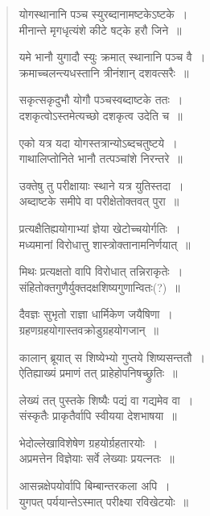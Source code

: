 \documentclass[11pt, openany]{book}
\begin{document}
\begin{quote}
{\qt योगस्थानानि पञ्च स्युरब्दानामष्टकेऽष्टके~।\\
मीनान्ते मृगधृत्यंशे कीटे षट्के हरौ जिने~॥

यमे भानौ युगादौ स्युः क्रमात् स्थानानि पञ्च वै~।\\
क्रमाच्चलन्त्यधस्तानि त्रीनंशान् दशवत्सरैः~॥

सकृत्सकृदुभौ योगौ पञ्चस्वब्दाष्टके ततः~।\\
दशकृत्वोऽस्तमेत्यच्छो दशकृत्व उदेति च~॥

एको यत्र यदा योगस्तत्रान्योऽब्दचतुष्टये~।\\
गाथालिप्तोनिते भानौ तत्पञ्चांशे निरन्तरे~॥

उक्तेषु तु परीक्षायाः स्थाने यत्र युतिस्तदा~।\\
अब्दाष्टके समीपे वा परीक्षेतोक्तवत् पुरा~॥

प्रत्यक्षैतिह्ययोगाभ्यां ज्ञेया खेटोच्चयोर्गतिः~।\\
मध्यमानां विरोधात्तु शास्त्रोक्तानामनिर्णयात्~॥

मिथः प्रत्यक्षतो वापि विरोधात् तन्निराकृतेः~।\\
संहितोक्तगुणैर्युक्तदक्षशिष्यगुणान्वितः(?)~॥

दैवज्ञः सुभृतो राज्ञा धार्मिकेण जयैषिणा~।\\
ग्रहणग्रहयोगास्तवक्रोडुग्रहयोगजान्~॥

कालान् ब्रूयात् स शिष्येभ्यो गुप्तये शिष्यसन्ततौ~।\\
ऐतिह्याख्यं प्रमाणं तत् प्राहेहोपनिषच्छ्रुतिः~॥

लेख्यं तत् पुस्तके शिष्यैः पद्यं वा गद्यमेव वा~।\\
संस्कृतैः प्राकृतैर्वापि स्वीयया देशभाषया~॥

भेदोल्लेखाविशेषेण ग्रहयोर्ग्रहतारयोः~।\\
अप्रमत्तेन विज्ञेयाः सर्वे लेख्याः प्रयत्नतः~॥

आसन्नक्षेपयोर्वापि बिम्बान्तरकला अपि~।\\
युगपत् पर्ययान्तेऽस्मात् परीक्ष्या रविखेटयोः~॥}
\end{quote}

\newpage
\end{document}
